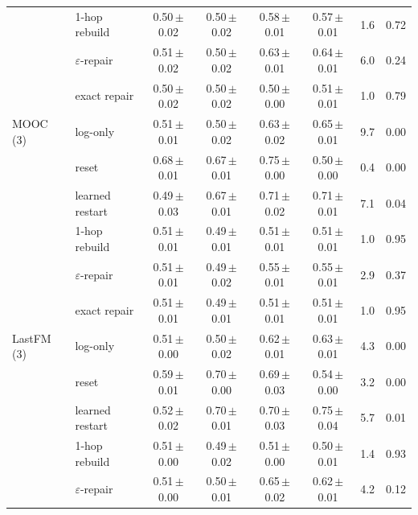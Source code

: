 \begin{table}[!htb]
\begin{tabular}{@{}llcccccr@{}}
 & 1-hop rebuild & 0.50\,{\scriptsize$\pm$0.02} & 0.50\,{\scriptsize$\pm$0.02} & 0.58\,{\scriptsize$\pm$0.01} & 0.57\,{\scriptsize$\pm$0.01} & 1.6 & 0.72 \\
 & $\varepsilon$-repair & 0.51\,{\scriptsize$\pm$0.02} & 0.50\,{\scriptsize$\pm$0.02} & 0.63\,{\scriptsize$\pm$0.01} & 0.64\,{\scriptsize$\pm$0.01} & 6.0 & 0.24 \\
 & exact repair & 0.50\,{\scriptsize$\pm$0.02} & 0.50\,{\scriptsize$\pm$0.02} & 0.50\,{\scriptsize$\pm$0.00} & 0.51\,{\scriptsize$\pm$0.01} & 1.0 & 0.79 \\
\midrule
MOOC (3) & log-only & 0.51\,{\scriptsize$\pm$0.01} & 0.50\,{\scriptsize$\pm$0.02} & 0.63\,{\scriptsize$\pm$0.02} & 0.65\,{\scriptsize$\pm$0.01} & 9.7 & 0.00 \\
 & reset & 0.68\,{\scriptsize$\pm$0.01} & 0.67\,{\scriptsize$\pm$0.01} & 0.75\,{\scriptsize$\pm$0.00} & 0.50\,{\scriptsize$\pm$0.00} & 0.4 & 0.00 \\
 & learned restart & 0.49\,{\scriptsize$\pm$0.03} & 0.67\,{\scriptsize$\pm$0.01} & 0.71\,{\scriptsize$\pm$0.02} & 0.71\,{\scriptsize$\pm$0.01} & 7.1 & 0.04 \\
 & 1-hop rebuild & 0.51\,{\scriptsize$\pm$0.01} & 0.49\,{\scriptsize$\pm$0.01} & 0.51\,{\scriptsize$\pm$0.01} & 0.51\,{\scriptsize$\pm$0.01} & 1.0 & 0.95 \\
 & $\varepsilon$-repair & 0.51\,{\scriptsize$\pm$0.01} & 0.49\,{\scriptsize$\pm$0.02} & 0.55\,{\scriptsize$\pm$0.01} & 0.55\,{\scriptsize$\pm$0.01} & 2.9 & 0.37 \\
 & exact repair & 0.51\,{\scriptsize$\pm$0.01} & 0.49\,{\scriptsize$\pm$0.01} & 0.51\,{\scriptsize$\pm$0.01} & 0.51\,{\scriptsize$\pm$0.01} & 1.0 & 0.95 \\
\midrule
LastFM (3) & log-only & 0.51\,{\scriptsize$\pm$0.00} & 0.50\,{\scriptsize$\pm$0.02} & 0.62\,{\scriptsize$\pm$0.01} & 0.63\,{\scriptsize$\pm$0.01} & 4.3 & 0.00 \\
 & reset & 0.59\,{\scriptsize$\pm$0.01} & 0.70\,{\scriptsize$\pm$0.00} & 0.69\,{\scriptsize$\pm$0.03} & 0.54\,{\scriptsize$\pm$0.00} & 3.2 & 0.00 \\
 & learned restart & 0.52\,{\scriptsize$\pm$0.02} & 0.70\,{\scriptsize$\pm$0.01} & 0.70\,{\scriptsize$\pm$0.03} & 0.75\,{\scriptsize$\pm$0.04} & 5.7 & 0.01 \\
 & 1-hop rebuild & 0.51\,{\scriptsize$\pm$0.00} & 0.49\,{\scriptsize$\pm$0.02} & 0.51\,{\scriptsize$\pm$0.00} & 0.50\,{\scriptsize$\pm$0.01} & 1.4 & 0.93 \\
 & $\varepsilon$-repair & 0.51\,{\scriptsize$\pm$0.00} & 0.50\,{\scriptsize$\pm$0.01} & 0.65\,{\scriptsize$\pm$0.02} & 0.62\,{\scriptsize$\pm$0.01} & 4.2 & 0.12 \\

\end{tabular}
\end{table}
